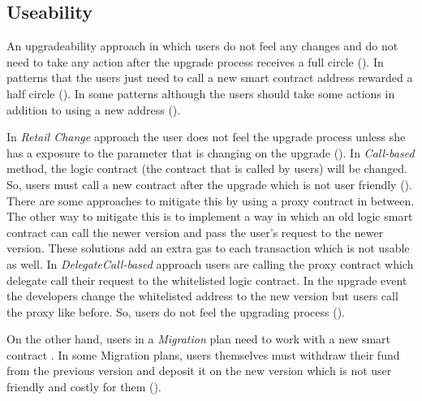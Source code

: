 

 \subsection{Useability}
 An upgradeability approach in which users do not feel any changes and do not need to take any action after the upgrade process receives a full circle (\CIRCLE). In patterns that the users just need to call a new smart contract address rewarded a half circle (\LEFTcircle). In some patterns although the users should take some actions in addition to using a new address (\Circle).     
 
 In \textit{Retail Change} approach the user does not feel the upgrade process unless she has a exposure to the parameter that is changing on the upgrade (\CIRCLE).
In \textit{Call-based} method, the logic contract (the contract that is called by users) will be changed. So, users must call a new contract after the upgrade which is not user friendly (\LEFTcircle). There are some approaches to mitigate this by using a proxy contract in between. The other way to mitigate this is to implement a way in which an old logic smart contract can call the newer version and pass the user's request to the newer version. These solutions add an extra gas to each transaction which is not usable as well.
In \textit{DelegateCall-based} approach users are calling the proxy contract which delegate call their request to the whitelisted logic contract. In the upgrade event the developers change the whitelisted address to the new version but users call the proxy like before. So, users do not feel the upgrading process (\CIRCLE).

On the other hand, users in a \textit{Migration} plan need to work with a new smart contract . In some Migration plans, users themselves must withdraw their fund from the previous version and deposit it on the new version which is not user friendly and costly for them (\Circle).

